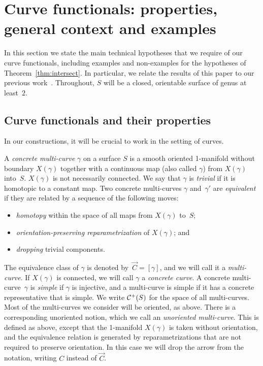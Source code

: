 \section{Curve functionals: properties, general context and examples}
\label{sec:functionals}

In this section we state the main technical hypotheses that we require
of our curve functionals, including examples and non-examples for the
hypotheses of Theorem~\ref{thm:intersect}.
In particular, we relate the results of this paper to our previous
work~\cite{MGT21:Smoothings}.
Throughout, $S$ will be a closed, orientable surface of genus at least~$2$.

\subsection{Curve functionals and their properties}
\label{subsec:mainhypotheses}

In our constructions, it will be crucial to work in the setting of curves.

\begin{definition}\label{def:multi-curve}  
A \emph{concrete multi-curve} $\gamma$ on a surface $S$ is a smooth
oriented 1-manifold without boundary $X(\gamma)$ together with a continuous map
(also called $\gamma$) from $X(\gamma)$
into~$S$. $X(\gamma)$ is not necessarily connected.
We say that $\gamma$ is \emph{trivial} if it is
homotopic to a constant map.
Two concrete multi-curves $\gamma$ and~$\gamma'$ are \emph{equivalent} if
they are related by a sequence of the following moves:
\begin{itemize}
    \item \emph{homotopy} within the space of all maps from $X(\gamma)$ to~$S$;
    \item \emph{orientation-preserving reparametrization} of $X(\gamma)$; and
    \item \emph{dropping} trivial components.
\end{itemize}
The equivalence class of $\gamma$ is denoted by~$\vec{C}=[\gamma]$,
and we will
call it a \emph{multi-curve}. 
If $X(\gamma)$ is connected, we will call $\gamma$ a \emph{concrete curve}.
A concrete multi-curve~$\gamma$ is \emph{simple} if $\gamma$ is injective, and a multi-curve is simple if it has a concrete representative
that is simple.
We write $\mathcal{C}^+(S)$ for the space of all multi-curves.
Most of the multi-curves we consider will be oriented, as above. There
is a corresponding unoriented notion, which we call an
\emph{unoriented multi-curve}. This is defined as above, except that
the 1-manifold $X(\gamma)$ is taken without orientation, and the
equivalence relation is generated by reparametrizations that are not
required to preserve orientation. In this case we will drop the arrow
from the notation, writing $C$ instead of $\vec{C}$.
\end{definition}


